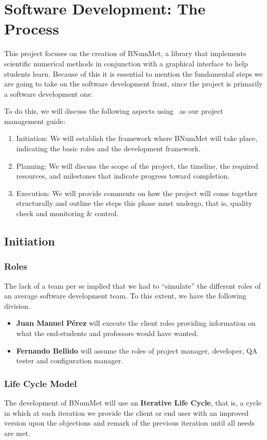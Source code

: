 \chapter{Software Development: The Process}
This project focuses on the creation of BNumMet, a library that implements scientific numerical methods in conjunction with a graphical interface to help students learn. Because of this it is essential to mention the fundamental steps we are going to take on the software development front, since the project is primarily a software development one. 

To do this, we will discuss the following aspects using~\cite{PMBOK2013} as our project management guide:
\begin{enumerate}
    \item Initiation: We will establish the framework where BNumMet will take place, indicating the basic roles and the development framework.
    \item Planning: We will discuss the scope of the project, the timeline, the required resources, and milestones that indicate progress toward completion.
    \item Execution: We will provide comments on how the project will come together structurally and outline the steps this phase must undergo, that is, quality check and monitoring \& control.
\end{enumerate}


\section{Initiation}
\subsection{Roles}
The lack of a team per se implied that we had to ``simulate'' the different roles of an average software development team.
To this extent, we have the following division.
\begin{itemize}
    \item \textbf{Juan Manuel Pérez} will execute the client roles providing information on what the end-students and professors would have wanted.
    \item \textbf{Fernando Bellido} will assume the roles of project manager, developer, QA tester and configuration manager.
\end{itemize}

\subsection{Life Cycle Model}
The development of BNumMet will use an \textbf{Iterative Life Cycle}, that is, a cycle in which at each iteration we provide the client or end user with an improved version upon the objections and remark of the previous iteration until all needs are met.

